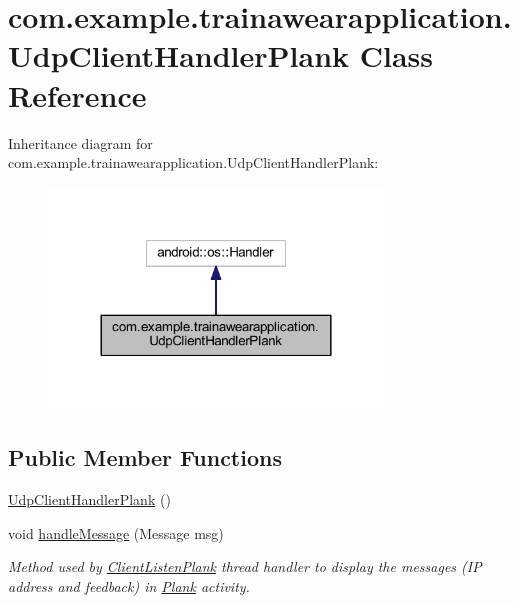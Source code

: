 \hypertarget{classcom_1_1example_1_1trainawearapplication_1_1_udp_client_handler_plank}{}\section{com.\+example.\+trainawearapplication.\+Udp\+Client\+Handler\+Plank Class Reference}
\label{classcom_1_1example_1_1trainawearapplication_1_1_udp_client_handler_plank}


Inheritance diagram for com.\+example.\+trainawearapplication.\+Udp\+Client\+Handler\+Plank\+:
\nopagebreak
\begin{figure}[H]
\begin{center}
\leavevmode
\includegraphics[width=252pt]{classcom_1_1example_1_1trainawearapplication_1_1_udp_client_handler_plank__inherit__graph}
\end{center}
\end{figure}
\subsection*{Public Member Functions}
\begin{DoxyCompactItemize}
\item 
\mbox{\hyperlink{classcom_1_1example_1_1trainawearapplication_1_1_udp_client_handler_plank_a648a0fa42206709b739c8b754aa178dd}{Udp\+Client\+Handler\+Plank}} ()
\item 
void \mbox{\hyperlink{classcom_1_1example_1_1trainawearapplication_1_1_udp_client_handler_plank_a2182425709c67eae734dd1f8dc2e228c}{handle\+Message}} (Message msg)
\begin{DoxyCompactList}\small\item\em Method used by \mbox{\hyperlink{classcom_1_1example_1_1trainawearapplication_1_1_client_listen_plank}{Client\+Listen\+Plank}} thread handler to display the messages (IP address and feedback) in \mbox{\hyperlink{classcom_1_1example_1_1trainawearapplication_1_1_plank}{Plank}} activity. \end{DoxyCompactList}\end{DoxyCompactItemize}
